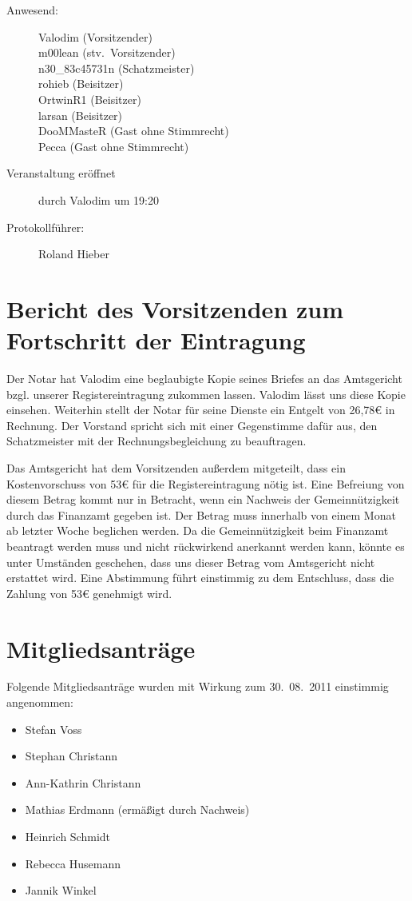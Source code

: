 \documentclass[a4paper,12pt]{scrartcl}
\title{\mytitle}
\date{\mydate}
\begin{document}
\maketitle

\begin{description}
 \item[Anwesend:] Valodim (Vorsitzender) \\
    m00lean (stv.~Vorsitzender) \\
    n30\_83c45731n (Schatzmeister) \\
    rohieb (Beisitzer) \\
    OrtwinR1 (Beisitzer) \\
    larsan (Beisitzer) \\
    DooMMasteR (Gast ohne Stimmrecht) \\
    Pecca (Gast ohne Stimmrecht)
  \item[Veranstaltung eröffnet] durch Valodim um 19:20
  \item[Protokollführer:] Roland Hieber
\end{description}

\section{Bericht des Vorsitzenden zum Fortschritt der Eintragung}
Der Notar hat Valodim eine beglaubigte Kopie seines Briefes an das Amtsgericht
bzgl. unserer Registereintragung zukommen lassen. Valodim lässt uns diese Kopie
einsehen. Weiterhin stellt der Notar für seine Dienste ein Entgelt von 26,78€ in
Rechnung. Der Vorstand spricht sich mit einer Gegenstimme dafür aus, den
Schatzmeister mit der Rechnungsbegleichung zu beauftragen.

Das Amtsgericht hat dem Vorsitzenden außerdem mitgeteilt, dass ein
Kostenvorschuss von 53€ für die Registereintragung nötig ist. Eine Befreiung
von diesem Betrag kommt nur in Betracht, wenn ein Nachweis der
Gemeinnützigkeit durch das Finanzamt gegeben ist. Der Betrag muss innerhalb von
einem Monat ab letzter Woche beglichen werden. Da die Gemeinnützigkeit beim
Finanzamt beantragt werden muss und nicht rückwirkend anerkannt werden kann,
könnte es unter Umständen geschehen, dass uns dieser Betrag vom Amtsgericht
nicht erstattet wird. Eine Abstimmung führt einstimmig zu dem Entschluss, dass
die Zahlung von 53€ genehmigt wird.

\section{Mitgliedsanträge}
Folgende Mitgliedsanträge wurden mit Wirkung zum 30.~08.~2011 einstimmig
angenommen:
\begin{itemize}
 \item Stefan Voss
 \item Stephan Christann
 \item Ann-Kathrin Christann
 \item Mathias Erdmann (ermäßigt durch Nachweis)
 \item Heinrich Schmidt
 \item Rebecca Husemann
 \item Jannik Winkel
\end{itemize}
\end{document}
